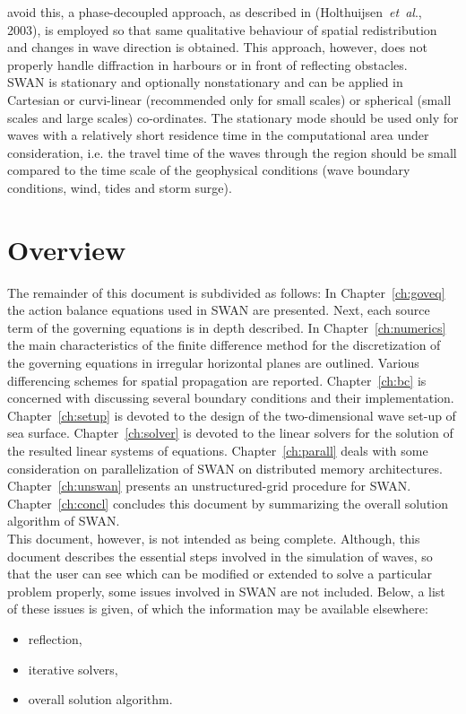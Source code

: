 \documentclass[12pt]{book}
\begin{document}
avoid this, a phase-decoupled approach, as described in (Holthuijsen~{\it et~al}., 2003),
is employed so that same qualitative behaviour of spatial redistribution and changes in wave direction is
obtained. This approach, however, does not properly handle diffraction in harbours
or in front of reflecting obstacles.
\nocite{Hol03HB}
\\[2ex]
\noindent
SWAN is stationary and optionally nonstationary and can be applied in Cartesian or curvi-linear
(recommended only for small scales) or spherical (small scales and large scales) co-ordinates. The
stationary mode should be used only for waves with a relatively short residence time in the computational
area under consideration, i.e. the travel time of the waves through the region should be small compared
to the time scale of the geophysical conditions (wave boundary conditions, wind, tides and storm surge).

\section{Overview} \label{sec:overv}

The remainder of this document is subdivided as follows: In Chapter~\ref{ch:goveq} the action balance equations
used in SWAN are presented. Next, each source term of the governing equations is in depth described.
In Chapter~\ref{ch:numerics} the main characteristics of the finite difference method for the discretization
of the governing equations in irregular horizontal planes are outlined. Various differencing schemes for spatial
propagation are reported. Chapter~\ref{ch:bc} is concerned with discussing several boundary conditions and their
implementation.
Chapter~\ref{ch:setup} is devoted to the design of the two-dimensional wave set-up of sea surface.
Chapter~\ref{ch:solver} is devoted to the linear solvers for the solution of the resulted linear
systems of equations.
Chapter~\ref{ch:parall} deals with some consideration on parallelization of SWAN on
distributed memory architectures.
Chapter~\ref{ch:unswan} presents an unstructured-grid procedure for SWAN.
Chapter~\ref{ch:concl} concludes this document by summarizing the overall solution algorithm of SWAN.
\\[2ex]
\noindent
This document, however, is not intended as being complete. Although, this document describes the essential steps
involved in the simulation of waves, so that the user can see which can be modified or extended to solve
a particular problem properly, some issues involved in SWAN are not included. Below, a list of these issues is
given, of which the information may be available elsewhere:
\begin{itemize}
  \item reflection,
  \item iterative solvers,
  \item overall solution algorithm.
\end{itemize}
\end{document}
